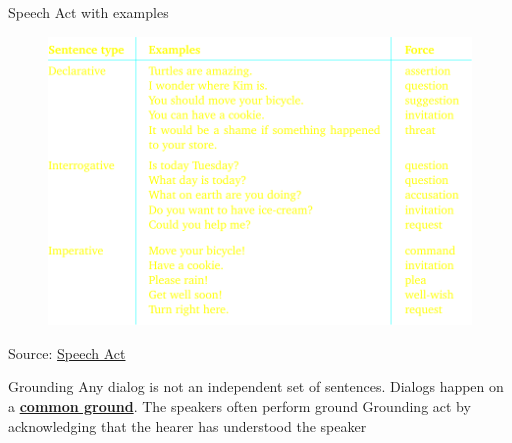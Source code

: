 \begin{frame}{Speech Act with examples}
    \begin{figure}
        \includegraphics[width=0.7\linewidth]{Images/speech_Act_Example}
        \label{fig:speechactexample}
    \end{figure}
    Source: \href{https://web.stanford.edu/class/linguist130a/2022/materials/ling130a-handout-03-08-speechacts.pdf}{Speech Act}
\end{frame}

\begin{frame}{Grounding}
    Any dialog is not an independent set of sentences. Dialogs happen on a \textbf{\underline{common ground}}. The speakers often perform ground Grounding act by acknowledging that the hearer has understood the speaker
\end{frame}